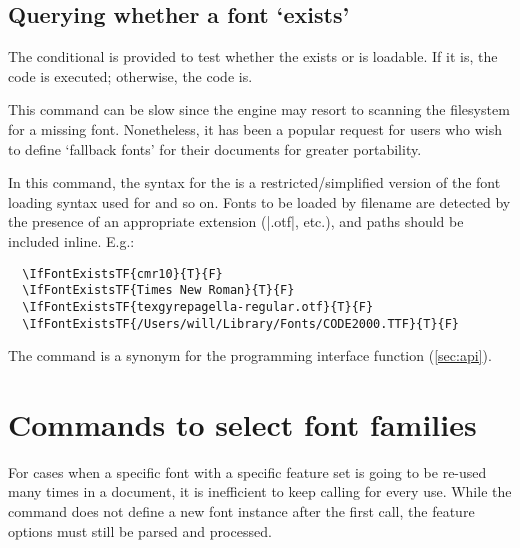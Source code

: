 \documentclass[a4paper]{l3doc}
\begin{document}
\subsection{Querying whether a font `exists'}


The conditional  is provided to test whether the  exists or is loadable.
If it is, the  code is executed; otherwise, the  code is.

This command can be slow since the engine may resort to scanning the filesystem for a missing font.
Nonetheless, it has been a popular request for users who wish to define `fallback fonts' for their documents for greater portability.

In this command, the syntax for the  is a restricted/simplified version of the font loading syntax used for  and so on.
Fonts to be loaded by filename are detected by the presence of an appropriate extension (|.otf|, etc.), and paths should be included inline.
E.g.:
\begin{Verbatim}
  \IfFontExistsTF{cmr10}{T}{F}
  \IfFontExistsTF{Times New Roman}{T}{F}
  \IfFontExistsTF{texgyrepagella-regular.otf}{T}{F}
  \IfFontExistsTF{/Users/will/Library/Fonts/CODE2000.TTF}{T}{F}
\end{Verbatim}

The  command is a synonym for the programming interface function  (\vref*{sec:api}).



\section{Commands to select font families}


\noindent For cases when a specific font with a specific
feature set is going to be re-used many times in a document, it is inefficient
to keep calling  for every use. While the  command does not define
a new font instance after the first call, the feature options must still be
parsed and processed.
\end{document}
